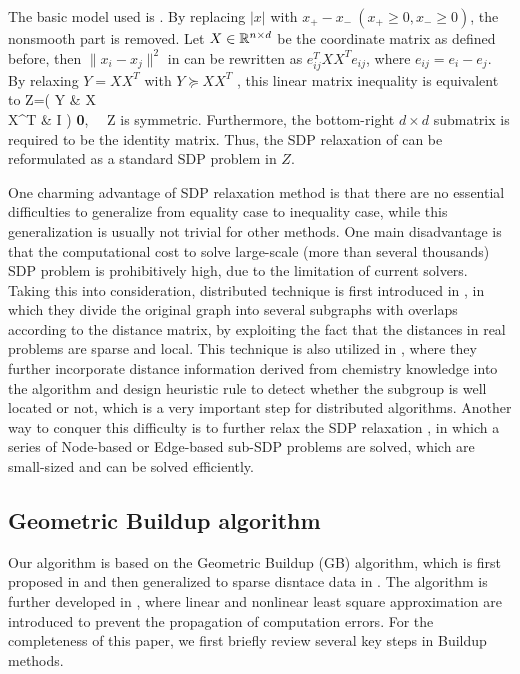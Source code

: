 \documentclass[a4paper,12pt]{article}
\begin{document}
The basic model used is . By replacing $|x|$ with $x_+-x_- ~(x_+\geq 0, x_-\geq 0)$, the nonsmooth part is removed. Let $X\in \mathbb{R}^{n\times d}$ be the coordinate matrix as defined before, then $\|x_i-x_j\|^2$ in  can be rewritten as $e_{ij}^TXX^Te_{ij}$, where $e_{ij}=e_i-e_j$. By relaxing $Y=XX^T$ with $Y\succeq XX^T$ \cite{Boyd1994}, this linear matrix inequality is equivalent to
\be Z=\left( Y & X \\ X^T & I \ea \right) \succeq \textbf{0}, ~~Z \textrm{ is symmetric}.\ee
Furthermore, the bottom-right $d\times d$ submatrix is required to be the identity matrix. Thus, the SDP relaxation of  can be reformulated as a standard SDP problem in $Z$.

One charming advantage of SDP relaxation method is that there are no essential difficulties to generalize from equality case to inequality case, while this generalization is usually not trivial for other methods. One main disadvantage is that the computational cost to solve large-scale (more than several thousands) SDP problem is prohibitively high, due to the limitation of current solvers. Taking this into consideration, distributed technique is first introduced in \cite{Biswas2008}, in which they divide the original graph into several subgraphs with overlaps according to the distance matrix, by exploiting the fact that the distances in real problems are sparse and local. This technique is also utilized in \cite{Fang2013}, where they further incorporate distance information derived from chemistry knowledge into the algorithm and design heuristic rule to detect whether the subgroup is well located or not, which is a very important step for distributed algorithms. Another way to conquer this difficulty is to further relax the SDP relaxation \cite{Wang2008}, in which a series of Node-based or Edge-based sub-SDP problems are solved, which are small-sized and can be solved efficiently.


\subsection{Geometric Buildup algorithm}\label{subsec:GB}
Our algorithm is based on the Geometric Buildup (GB) algorithm, which is first proposed in \cite{Dong2002} and then generalized to sparse disntace data in \cite{Wu2006}. The algorithm is further developed in \cite{Wu2008,Sit2009}, where linear and nonlinear least square approximation are introduced to prevent the propagation of computation errors. For the completeness of this paper, we first briefly review several key steps in Buildup methods.
\end{document}
